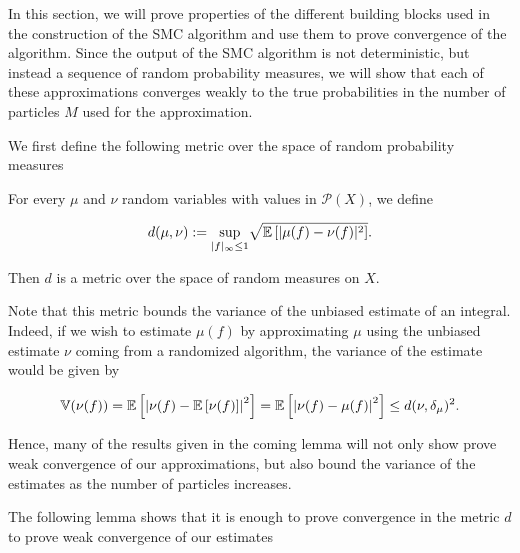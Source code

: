 In this section, we will prove properties of the different building blocks used in the construction of the SMC algorithm and use them to prove convergence of the algorithm. Since the output of the SMC algorithm is not deterministic, but instead a sequence of random probability measures, we will show that each of these approximations converges weakly to the true probabilities in the number of particles $M$ used for the approximation.

We first define the following metric over the space of random probability measures

\begin{definition}
  For every $\mu$ and $\nu$ random variables with values in $\mathcal{P}(X)$, we define

  \begin{equation*}
    d(\mu, \nu) := \underset{|f|_\infty\le1}{\text{sup}} \sqrt{\mathbb{E}\left[|\mu(f) - \nu(f)|^2\right]}.
  \end{equation*}

Then $d$ is a metric over the space of random measures on $X$.
\end{definition}

Note that this metric bounds the variance of the unbiased estimate of an integral. Indeed, if we wish to estimate $\mu(f)$ by approximating $\mu$ using the unbiased estimate $\nu$ coming from a randomized algorithm, the variance of the estimate would be given by

\begin{equation*}
  \mathbb{V}(\nu(f)) = \mathbb{E}\left[\left|\nu(f) - \mathbb{E}\left[\nu(f)\right]\right|^2\right] = \mathbb{E}\left[\left|\nu(f) - \mu(f)\right|^2\right] \le d(\nu, \delta_\mu)^2.
\end{equation*}

Hence, many of the results given in the coming lemma will not only show prove weak convergence of our approximations, but also bound the variance of the estimates as the number of particles increases.

The following lemma shows that it is enough to prove convergence in the metric $d$ to prove weak convergence of our estimates

